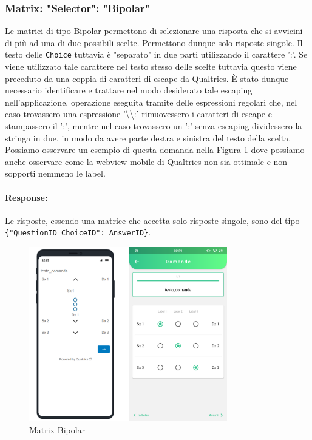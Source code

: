 \subsubsection{Matrix: "Selector": "Bipolar"}
Le matrici di tipo Bipolar permettono di selezionare una risposta che si avvicini di più ad una di due possibili scelte. Permettono dunque solo risposte singole. Il testo delle \texttt{Choice} tuttavia è "separato" in due parti utilizzando il carattere ':'. Se viene utilizzato tale carattere nel testo stesso delle scelte tuttavia questo viene preceduto da una coppia di caratteri di escape da Qualtrics. È stato dunque necessario identificare e trattare nel modo desiderato tale escaping nell'applicazione, operazione eseguita tramite delle espressioni regolari che, nel caso trovassero una espressione '\textbackslash\textbackslash:' rimuovessero i caratteri di escape e stampassero il ':', mentre nel caso trovassero un ':' senza escaping dividessero la stringa in due, in modo da avere parte destra e sinistra del testo della scelta. Possiamo osservare un esempio di questa domanda nella Figura \ref{fig:matrix_bipolar} dove possiamo anche osservare come la webview mobile di Qualtrics non sia ottimale e non sopporti nemmeno le label.

\paragraph{Response:}
Le risposte, essendo una matrice che accetta solo risposte singole, sono del tipo \texttt{\{"QuestionID\_ChoiceID": AnswerID\}}.

\begin{figure}[h!]
\centering
\includegraphics[width=0.77\textwidth]{img/matrix_bipolar}
\caption{Matrix Bipolar}
\label{fig:matrix_bipolar}
\end{figure}

